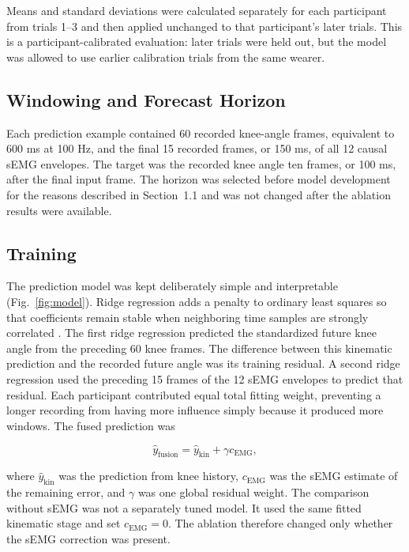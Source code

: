 \documentclass[referee,lineno,pdflatex,sn-vancouver-num]{sn-jnl}
\begin{document}
Means and standard deviations were calculated separately for each participant from trials 1--3 and then applied unchanged to that participant's later trials. This is a participant-calibrated evaluation: later trials were held out, but the model was allowed to use earlier calibration trials from the same wearer.

\subsection{Windowing and Forecast Horizon}

Each prediction example contained 60 recorded knee-angle frames, equivalent to 600 ms at 100 Hz, and the final 15 recorded frames, or 150 ms, of all 12 causal sEMG envelopes. The target was the recorded knee angle ten frames, or 100 ms, after the final input frame. The horizon was selected before model development for the reasons described in Section~1.1 and was not changed after the ablation results were available.

\subsection{Training}

The prediction model was kept deliberately simple and interpretable (Fig.~\ref{fig:model}). Ridge regression adds a penalty to ordinary least squares so that coefficients remain stable when neighboring time samples are strongly correlated \cite{hoerl1970}. The first ridge regression predicted the standardized future knee angle from the preceding 60 knee frames. The difference between this kinematic prediction and the recorded future angle was its training residual. A second ridge regression used the preceding 15 frames of the 12 sEMG envelopes to predict that residual. Each participant contributed equal total fitting weight, preventing a longer recording from having more influence simply because it produced more windows. The fused prediction was

\begin{equation}
\hat y_{\mathrm{fusion}}=\hat y_{\mathrm{kin}}+\gamma c_{\mathrm{EMG}},
\end{equation}

where $\hat y_{\mathrm{kin}}$ was the prediction from knee history, $c_{\mathrm{EMG}}$ was the sEMG estimate of the remaining error, and $\gamma$ was one global residual weight. The comparison without sEMG was not a separately tuned model. It used the same fitted kinematic stage and set $c_{\mathrm{EMG}}=0$. The ablation therefore changed only whether the sEMG correction was present.
\end{document}

